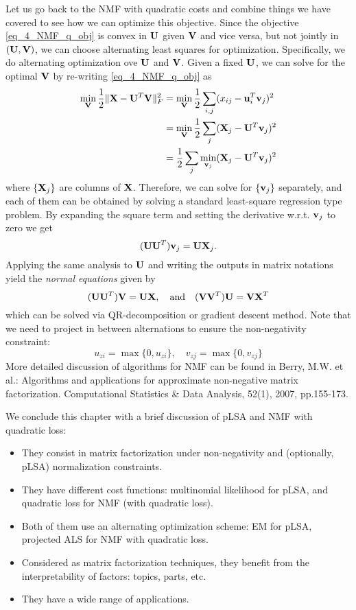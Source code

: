 \documentclass[../book-template.tex]{subfiles}
\begin{document}
\par Let us go back to the NMF with quadratic costs and combine things we have covered to see how we can optimize this objective. Since the objective \eqref{eq_4_NMF_q_obj} is convex in ${\bf U}$ given ${\bf V}$ and vice versa, but not jointly in $({\bf U,V})$, we can choose alternating least squares for optimization. Specifically, we do alternating optimization ove ${\bf U}$ and ${\bf V}$. Given a fixed ${\bf U}$, we can solve for the optimal ${\bf V}$ by re-writing \eqref{eq_4_NMF_q_obj} as
\begin{align*}
	\min_{\bf V}\frac{1}{2}\|{\bf X}-{\bf U}^T{\bf V}\|_F^2 &=\min_{\bf V} \frac{1}{2}\sum_{i,j}(x_{ij}-{\bf u}_i^T{\bf v}_j)^2\\
	&=\min_{\bf V}\frac{1}{2}\sum_j ({\bf X}_j - {\bf U}^T{\bf v}_j)^2\\
	&=\frac{1}{2}\sum_j \min_{{\bf v}_j}({\bf X}_j - {\bf U}^T{\bf v}_j)^2
\end{align*}
where $\{{\bf X}_j\}$ are columns of ${\bf X}$. Therefore, we can solve for $\{{\bf v}_j\}$ separately, and each of them can be obtained by solving a standard least-square regression type problem. By expanding the square term and setting the derivative w.r.t. ${\bf v}_j$ to zero we get
\begin{equation*}
	({\bf UU}^T){\bf v}_j = {\bf UX}_j.
\end{equation*}
Applying the same analysis to ${\bf U}$ and writing the outputs in matrix notations yield the \emph{normal equations} given by
\begin{equation*}
	({\bf UU}^T){\bf V} = {\bf UX},\quad \text{and}\quad ({\bf VV}^T){\bf U} = {\bf VX}^T
\end{equation*}
which can be solved via QR-decomposition or gradient descent method. Note that we need to project in between alternations to ensure the non-negativity constraint:
\begin{equation*}
	u_{zi} = \max\{0,u_{zi}\},\quad v_{zj} = \max\{0, v_{zj}\}
\end{equation*}
More detailed discussion of algorithms for NMF can be found in Berry, M.W. et al.: Algorithms and applications for approximate non-negative matrix factorization. Computational Statistics \& Data Analysis, 52(1), 2007, pp.155-173.
\par We conclude this chapter with a brief discussion of pLSA and NMF with quadratic loss: 
\begin{itemize}
	\item They consist in matrix factorization under non-negativity and (optionally, pLSA) normalization constraints.
	\item They have different cost functions: multinomial likelihood for pLSA, and quadratic loss for NMF (with quadratic loss).
	\item Both of them use an 
	alternating optimization scheme: EM for pLSA, projected ALS for NMF with quadratic loss.
	\item Considered as matrix factorization techniques, they benefit from the interpretability of factors: topics, parts, etc.
	\item They have a wide range of applications.
\end{itemize}
\end{document}
